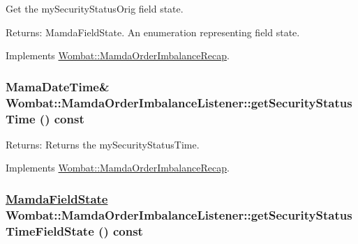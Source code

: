 Get the my\-Security\-Status\-Orig field state. 

\begin{Desc}
\item[Returns:]Mamda\-Field\-State. An enumeration representing field state. \end{Desc}


Implements \hyperlink{classWombat_1_1MamdaOrderImbalanceRecap_562a82c0673ef879851e3bbc2f0ac308}{Wombat::Mamda\-Order\-Imbalance\-Recap}.\hypertarget{classWombat_1_1MamdaOrderImbalanceListener_1e72e1cbb405c48d7acab9ea19b3014e}{
\subsubsection[getSecurityStatusTime]{\setlength{\rightskip}{0pt plus 5cm}Mama\-Date\-Time\& Wombat::Mamda\-Order\-Imbalance\-Listener::get\-Security\-Status\-Time () const}}
\label{classWombat_1_1MamdaOrderImbalanceListener_1e72e1cbb405c48d7acab9ea19b3014e}


\begin{Desc}
\item[Returns:]Returns the my\-Security\-Status\-Time. \end{Desc}


Implements \hyperlink{classWombat_1_1MamdaOrderImbalanceRecap_f8a6454c6f2df2cec6d1bf0947cb4863}{Wombat::Mamda\-Order\-Imbalance\-Recap}.\hypertarget{classWombat_1_1MamdaOrderImbalanceListener_7588daaf6700cd13510c480612e19fe0}{
\subsubsection[getSecurityStatusTimeFieldState]{\setlength{\rightskip}{0pt plus 5cm}\hyperlink{namespaceWombat_93aac974f2ab713554fd12a1fa3b7d2a}{Mamda\-Field\-State} Wombat::Mamda\-Order\-Imbalance\-Listener::get\-Security\-Status\-Time\-Field\-State () const}}
\label{classWombat_1_1MamdaOrderImbalanceListener_7588daaf6700cd13510c480612e19fe0}


